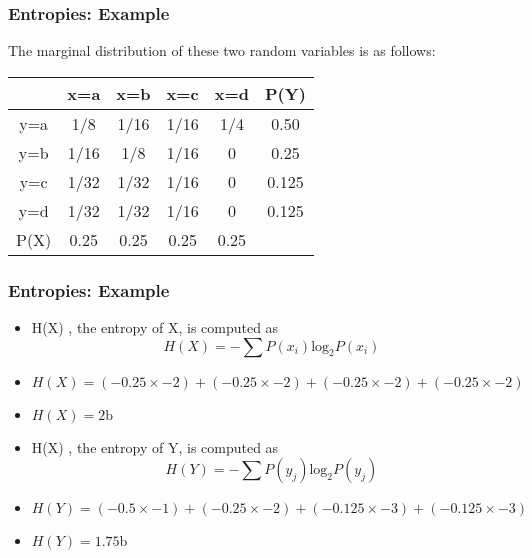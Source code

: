 \documentclass[a4]{beamer}
\begin{document}
\begin{frame}
\frametitle{Entropies: Example}
The marginal distribution of these two random variables is as follows:\\ \bigskip
\begin{center}
\begin{tabular}{|c|c|c|c|c||c|}
\hline
&x=a& x=b & x=c & x=d &\alert{P(Y)}\\ \hline
y=a &1/8 &1/16 &1/16 &1/4 & \alert{0.50}\\ \hline
y=b &1/16 & 1/8& 1/16& 0 & \alert{0.25}\\ \hline
y=c & 1/32&1/32 & 1/16 & 0& \alert{0.125}\\ \hline
y=d & 1/32& 1/32& 1/16 & 0& \alert{0.125}\\ \hline \hline
\alert{P(X)} & \alert{0.25}& \alert{0.25}& \alert{0.25} & \alert{0.25}&\\ \hline
\end{tabular}
\end{center}
\end{frame}


\begin{frame}
\frametitle{Entropies: Example}
\begin{itemize}

\item H(X) , the entropy of X, is computed as\\
 \[H(X) = -\sum P(x_i) \mbox{log}_2P(x_i)\] \item $H(X) =  (-0.25 \times -2) + (-0.25 \times -2) +(-0.25 \times -2) +(-0.25 \times -2)$\item $ H(X) = 2 \mbox{b}$ \bigskip

\item H(X) , the entropy of Y, is computed as\\
 \[H(Y) = -\sum P(y_j) \mbox{log}_2P(y_j)\] \item $H(Y) =  (-0.5 \times -1) +(-0.25 \times -2)  + (-0.125 \times -3)  +(-0.125 \times -3)$\item $ H(Y) = 1.75 \mbox{b}$


\end{itemize}
\end{frame}
\end{document}
